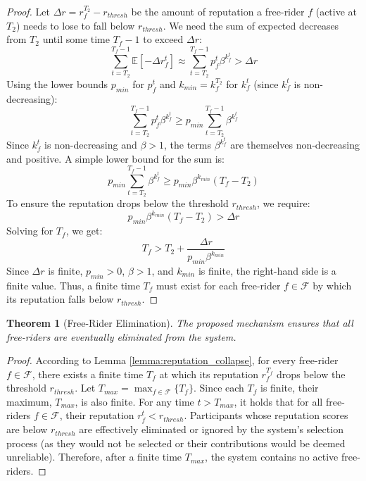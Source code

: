 \documentclass[conference]{IEEEtran}
\newtheorem{theorem}{Theorem}
\newcommand{\E}{\mathbb{E}}
\begin{document}
\begin{proof}
Let $\Delta r = r_f^{T_2} - r_{thresh}$ be the amount of reputation a free-rider $f$ (active at $T_2$) needs to lose to fall below $r_{thresh}$. We need the sum of expected decreases from $T_2$ until some time $T_f-1$ to exceed $\Delta r$:
\begin{equation}
    \sum_{t=T_2}^{T_f-1} \E[-\Delta r_f^t] \approx \sum_{t=T_2}^{T_f-1} p_f^t \beta^{k_f^t} > \Delta r
\end{equation}
Using the lower bounds $p_{min}$ for $p_f^t$ and $k_{min} = k_f^{T_2}$ for $k_f^t$ (since $k_f^t$ is non-decreasing):
\begin{equation}
    \sum_{t=T_2}^{T_f-1} p_f^t \beta^{k_f^t} \ge p_{min} \sum_{t=T_2}^{T_f-1} \beta^{k_f^t}
\end{equation}
Since $k_f^t$ is non-decreasing and $\beta > 1$, the terms $\beta^{k_f^t}$ are themselves non-decreasing and positive. A simple lower bound for the sum is:
\begin{equation}
    p_{min} \sum_{t=T_2}^{T_f-1} \beta^{k_f^t} \ge p_{min} \beta^{k_{min}} (T_f - T_2)
\end{equation}
To ensure the reputation drops below the threshold $r_{thresh}$, we require:
\begin{equation}
    p_{min} \beta^{k_{min}} (T_f - T_2) > \Delta r
\end{equation}
Solving for $T_f$, we get:
\begin{equation}
    T_f > T_2 + \frac{\Delta r}{p_{min} \beta^{k_{min}}}
\end{equation}
Since $\Delta r$ is finite, $p_{min} > 0$, $\beta > 1$, and $k_{min}$ is finite, the right-hand side is a finite value. Thus, a finite time $T_f$ must exist for each free-rider $f \in \mathcal{F}$ by which its reputation falls below $r_{thresh}$.
\end{proof}

\begin{theorem}[Free-Rider Elimination]
\label{theorem:fr_elimination}
The proposed mechanism ensures that all free-riders are eventually eliminated from the system.
\end{theorem}
\begin{proof}
According to Lemma \ref{lemma:reputation_collapse}, for every free-rider $f \in \mathcal{F}$, there exists a finite time $T_f$ at which its reputation $r_f^{T_f}$ drops below the threshold $r_{thresh}$.
Let $T_{max} = \max_{f \in \mathcal{F}} \{T_f\}$. Since each $T_f$ is finite, their maximum, $T_{max}$, is also finite.
For any time $t > T_{max}$, it holds that for all free-riders $f \in \mathcal{F}$, their reputation $r_f^t < r_{thresh}$.
Participants whose reputation scores are below $r_{thresh}$ are effectively eliminated or ignored by the system's selection process (as they would not be selected or their contributions would be deemed unreliable).
Therefore, after a finite time $T_{max}$, the system contains no active free-riders.
\end{proof}

% 
% 
\end{document}
